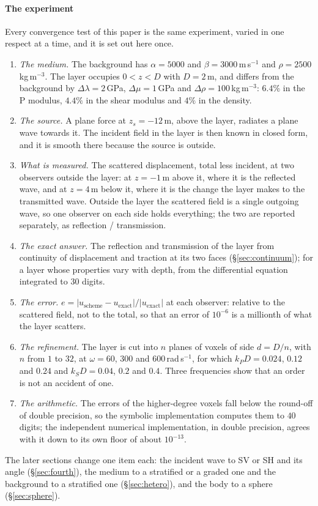 \documentclass[preprint,review,12pt]{elsarticle}
\begin{document}
\paragraph{The experiment} Every convergence test of this paper is the same experiment, varied in one
respect at a time, and it is set out here once.
\begin{enumerate}
\item \emph{The medium.} The background has $\alpha=5000$ and $\beta=3000$\,m\,s$^{-1}$ and
$\rho=2500$\,kg\,m$^{-3}$. The layer occupies $0<z<D$ with $D=2$\,m, and differs from the background by
$\Delta\lambda=2$\,GPa, $\Delta\mu=1$\,GPa and $\Delta\rho=100$\,kg\,m$^{-3}$: $6.4\%$ in the P modulus,
$4.4\%$ in the shear modulus and $4\%$ in the density.
\item \emph{The source.} A plane force at $z_s=-12$\,m, above the layer, radiates a plane wave towards
it. The incident field in the layer is then known in closed form, and it is smooth there because the
source is outside.
\item \emph{What is measured.} The scattered displacement, total less incident, at two observers
outside the layer: at $z=-1$\,m above it, where it is the reflected wave, and at $z=4$\,m below it,
where it is the change the layer makes to the transmitted wave. Outside the layer the scattered field
is a single outgoing wave, so one observer on each side holds everything; the two are reported
separately, as reflection / transmission.
\item \emph{The exact answer.} The reflection and transmission of the layer from continuity of
displacement and traction at its two faces (\S\ref{sec:continuum}); for a layer whose properties vary
with depth, from the differential equation integrated to $30$ digits.
\item \emph{The error.} $e=\lvert u_{\text{scheme}}-u_{\text{exact}}\rvert/\lvert u_{\text{exact}}\rvert$
at each observer: relative to the scattered field, not to the total, so that an error of $10^{-6}$ is a
millionth of what the layer scatters.
\item \emph{The refinement.} The layer is cut into $n$ planes of voxels of side $d=D/n$, with $n$ from
$1$ to $32$, at $\omega=60$, $300$ and $600$\,rad\,s$^{-1}$, for which $k_PD=0.024$, $0.12$ and $0.24$
and $k_SD=0.04$, $0.2$ and $0.4$. Three frequencies show that an order is not an accident of one.
\item \emph{The arithmetic.} The errors of the higher-degree voxels fall below the round-off of double
precision, so the symbolic implementation computes them to $40$ digits; the independent numerical
implementation, in double precision, agrees with it down to its own floor of about $10^{-13}$.
\end{enumerate}
The later sections change one item each: the incident wave to SV or SH and its angle
(\S\ref{sec:fourth}), the medium to a stratified or a graded one and the background to a stratified one
(\S\ref{sec:hetero}), and the body to a sphere (\S\ref{sec:sphere}).
\end{document}
